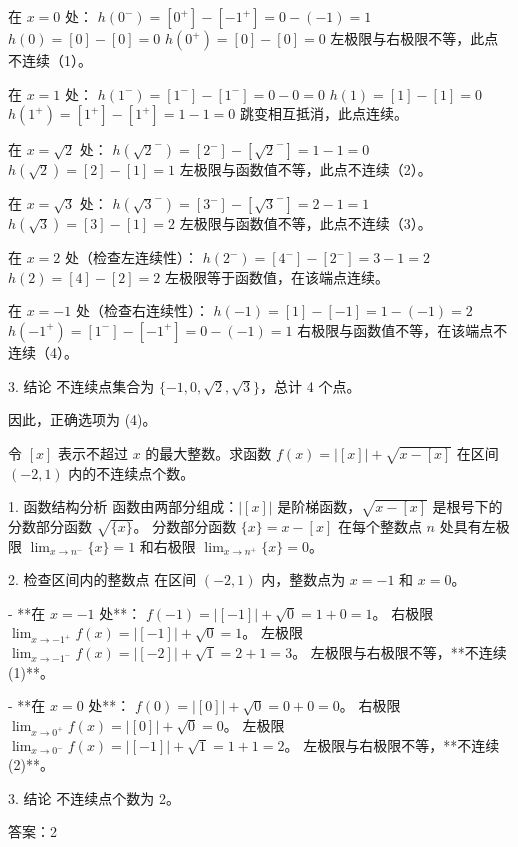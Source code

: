 \begin{questions}
\begin{solution}
在 $x = 0$ 处：
$h(0^-) = [0^+] - [-1^+] = 0 - (-1) = 1$
$h(0) = [0] - [0] = 0$
$h(0^+) = [0] - [0] = 0$
左极限与右极限不等，此点不连续（1）。

在 $x = 1$ 处：
$h(1^-) = [1^-] - [1^-] = 0 - 0 = 0$
$h(1) = [1] - [1] = 0$
$h(1^+) = [1^+] - [1^+] = 1 - 1 = 0$
跳变相互抵消，此点连续。

在 $x = \sqrt{2}$ 处：
$h(\sqrt{2}^-) = [2^-] - [\sqrt{2}^-] = 1 - 1 = 0$
$h(\sqrt{2}) = [2] - [1] = 1$
左极限与函数值不等，此点不连续（2）。

在 $x = \sqrt{3}$ 处：
$h(\sqrt{3}^-) = [3^-] - [\sqrt{3}^-] = 2 - 1 = 1$
$h(\sqrt{3}) = [3] - [1] = 2$
左极限与函数值不等，此点不连续（3）。

在 $x = 2$ 处（检查左连续性）：
$h(2^-) = [4^-] - [2^-] = 3 - 1 = 2$
$h(2) = [4] - [2] = 2$
左极限等于函数值，在该端点连续。

在 $x = -1$ 处（检查右连续性）：
$h(-1) = [1] - [-1] = 1 - (-1) = 2$
$h(-1^+) = [1^-] - [-1^+] = 0 - (-1) = 1$
右极限与函数值不等，在该端点不连续（4）。

3. 结论
不连续点集合为 $\{-1, 0, \sqrt{2}, \sqrt{3}\}$，总计 4 个点。

因此，正确选项为 (4)。
\end{solution}

\question 
令 $[x]$ 表示不超过 $x$ 的最大整数。求函数 $f(x) = |[x]| + \sqrt{x - [x]}$ 在区间 $(-2, 1)$ 内的不连续点个数。

\begin{solution}
1. 函数结构分析
函数由两部分组成：$|[x]|$ 是阶梯函数，$\sqrt{x - [x]}$ 是根号下的分数部分函数 $\sqrt{\{x\}}$。
分数部分函数 $\{x\} = x - [x]$ 在每个整数点 $n$ 处具有左极限 $\lim_{x \to n^-} \{x\} = 1$ 和右极限 $\lim_{x \to n^+} \{x\} = 0$。

2. 检查区间内的整数点
在区间 $(-2, 1)$ 内，整数点为 $x = -1$ 和 $x = 0$。

- **在 $x = -1$ 处**：
  $f(-1) = |[-1]| + \sqrt{0} = 1 + 0 = 1$。
  右极限 $\lim_{x \to -1^+} f(x) = |[-1]| + \sqrt{0} = 1$。
  左极限 $\lim_{x \to -1^-} f(x) = |[-2]| + \sqrt{1} = 2 + 1 = 3$。
  左极限与右极限不等，**不连续 (1)**。

- **在 $x = 0$ 处**：
  $f(0) = |[0]| + \sqrt{0} = 0 + 0 = 0$。
  右极限 $\lim_{x \to 0^+} f(x) = |[0]| + \sqrt{0} = 0$。
  左极限 $\lim_{x \to 0^-} f(x) = |[-1]| + \sqrt{1} = 1 + 1 = 2$。
  左极限与右极限不等，**不连续 (2)**。

3. 结论
不连续点个数为 2。

答案：2
\end{solution}


\end{questions}
